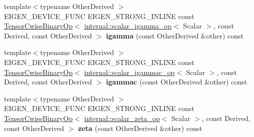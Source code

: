 \begin{DoxyCompactItemize}
\mbox{\label{class_eigen_1_1_tensor_base_3_01_derived_00_01_read_only_accessors_01_4_a3e379aac7e11cc5350d15a4343e527ce}} 
{\footnotesize template$<$typename Other\+Derived $>$ }\\E\+I\+G\+E\+N\+\_\+\+D\+E\+V\+I\+C\+E\+\_\+\+F\+U\+NC E\+I\+G\+E\+N\+\_\+\+S\+T\+R\+O\+N\+G\+\_\+\+I\+N\+L\+I\+NE const \hyperlink{class_eigen_1_1_tensor_cwise_binary_op}{Tensor\+Cwise\+Binary\+Op}$<$ \hyperlink{struct_eigen_1_1internal_1_1scalar__igamma__op}{internal\+::scalar\+\_\+igamma\+\_\+op}$<$ Scalar $>$, const Derived, const Other\+Derived $>$ {\bfseries igamma} (const Other\+Derived \&other) const
\item 
\mbox{\label{class_eigen_1_1_tensor_base_3_01_derived_00_01_read_only_accessors_01_4_a612b30bbcc4e2dcff1b757945a8a32b4}} 
{\footnotesize template$<$typename Other\+Derived $>$ }\\E\+I\+G\+E\+N\+\_\+\+D\+E\+V\+I\+C\+E\+\_\+\+F\+U\+NC E\+I\+G\+E\+N\+\_\+\+S\+T\+R\+O\+N\+G\+\_\+\+I\+N\+L\+I\+NE const \hyperlink{class_eigen_1_1_tensor_cwise_binary_op}{Tensor\+Cwise\+Binary\+Op}$<$ \hyperlink{struct_eigen_1_1internal_1_1scalar__igammac__op}{internal\+::scalar\+\_\+igammac\+\_\+op}$<$ Scalar $>$, const Derived, const Other\+Derived $>$ {\bfseries igammac} (const Other\+Derived \&other) const
\item 
\mbox{\label{class_eigen_1_1_tensor_base_3_01_derived_00_01_read_only_accessors_01_4_a0d71c480ff32548f7411f9501933187f}} 
{\footnotesize template$<$typename Other\+Derived $>$ }\\E\+I\+G\+E\+N\+\_\+\+D\+E\+V\+I\+C\+E\+\_\+\+F\+U\+NC E\+I\+G\+E\+N\+\_\+\+S\+T\+R\+O\+N\+G\+\_\+\+I\+N\+L\+I\+NE const \hyperlink{class_eigen_1_1_tensor_cwise_binary_op}{Tensor\+Cwise\+Binary\+Op}$<$ \hyperlink{struct_eigen_1_1internal_1_1scalar__zeta__op}{internal\+::scalar\+\_\+zeta\+\_\+op}$<$ Scalar $>$, const Derived, const Other\+Derived $>$ {\bfseries zeta} (const Other\+Derived \&other) const
\item 
\mbox{\label{class_eigen_1_1_tensor_base_3_01_derived_00_01_read_only_accessors_01_4_a0475fa6a5f5820de9a14dfc79372dd6a}} 

\end{DoxyCompactItemize}
